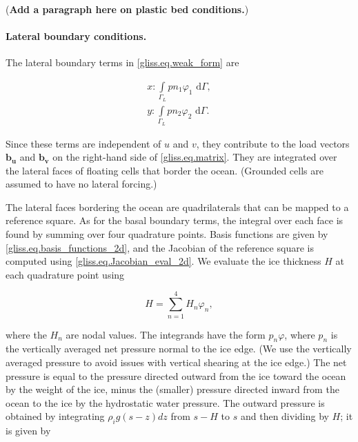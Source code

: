 (\textbf{Add a paragraph here on plastic bed conditions.})

\paragraph{Lateral boundary conditions.}

The lateral boundary terms in \eqref{gliss.eq.weak_form} are

\begin{equation}
  \label{gliss.eq.lateral_bc}
  \begin{split}
    x: \int\limits_{{\Gamma }_{L}} {p n_1 {{\varphi }_{1}} \text{ d}\Gamma}, \\
    y: \int\limits_{{\Gamma }_{L}} {p n_2 {{\varphi }_{2}} \text{ d}\Gamma}.
  \end{split}
\end{equation}

\noindent
Since these terms are independent of $u$ and $v$, they contribute to the load vectors
$\mathbf{b_u}$ and $\mathbf{b_v}$ on the right-hand side of \eqref{gliss.eq.matrix}.
They are integrated over the lateral faces of floating cells that border the ocean.
(Grounded cells are assumed to have no lateral forcing.)

The lateral faces bordering the ocean are quadrilaterals that can be mapped to a reference square.
As for the basal boundary terms, the integral over each face is found by 
summing over four quadrature points.
Basis functions are given by \eqref{gliss.eq.basis_functions_2d}, and
the Jacobian of the reference square is computed using \eqref{gliss.eq.Jacobian_eval_2d}.
We evaluate the ice thickness $H$ at each quadrature point using

\begin{equation}
  \label{gliss.eq.thickness_qp}
  H = \sum\limits_{n=1}^{4} {H_n \varphi_n},
\end{equation}

\noindent
where the $H_n$ are nodal values.
The integrands have the form $p_n \varphi$, where $p_n$ is the vertically averaged
net pressure normal to the ice edge.  
(We use the vertically averaged pressure to avoid issues with vertical shearing at the ice edge.)
The net pressure is equal to the pressure
directed outward from the ice toward the ocean by the weight of the ice, minus the (smaller)
pressure directed inward from the ocean to the ice by the hydrostatic water pressure.
The outward pressure is obtained by integrating $\rho_i g (s-z) dz$ from $s-H$ to $s$
and then dividing by $H$; it is given by 

